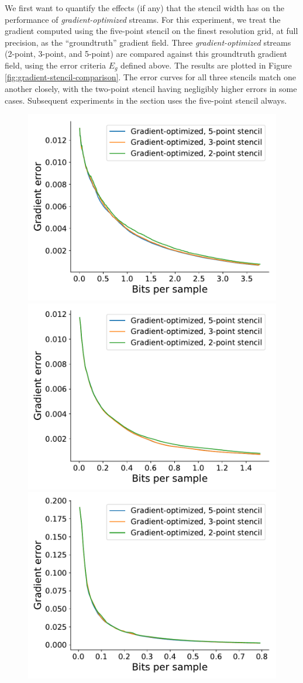 We first want to quantify the effects (if any) that the stencil width has on the performance of
\emph{gradient-optimized} streams. For this experiment, we treat the gradient computed using the
five-point stencil on the finest resolution grid, at full precision, as the ``groundtruth'' gradient
field. Three \emph{gradient-optimized} streams (2-point, 3-point, and 5-point) are compared against
this groundtruth gradient field, using the error criteria $E_g$ defined above. The results are
plotted in Figure \ref{fig:gradient-stencil-comparison}. The error curves for all three stencils
match one another closely, with the two-point stencil having negligibly higher errors in some cases.
Subsequent experiments in the section uses the five-point stencil always.

\begin{figure}
	\centering
	{\includegraphics[width=0.48\linewidth]{img/gradient/compare-stencils/gradient-optimized-boiler.pdf}}
	{\includegraphics[width=0.48\linewidth]{img/gradient/compare-stencils/gradient-optimized-diffusivity.pdf}}
	{\includegraphics[width=0.48\linewidth]{img/gradient/compare-stencils/gradient-optimized-euler.pdf}}

\end{figure}
